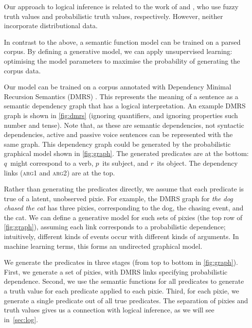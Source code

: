 \documentclass[11pt]{article}
\begin{document}
Our approach to logical inference is related to the work of
 and ,
who use fuzzy truth values and probabilistic truth values, respectively.
However, neither incorporate distributional data.

In contrast to the above,
a semantic function model can be trained on a parsed corpus.
By defining a generative model,
we can apply unsupervised learning:
optimising the model parameters
to maximise the probability of generating the corpus data.

Our model can be trained on a corpus annotated with
Dependency Minimal Recursion Semantics (DMRS)
\cite{copestake2005mrs,copestake2009dmrs}.
This represents the meaning of a sentence as a semantic dependency graph
that has a logical interpretation.
An example DMRS graph is shown in \cref{fig:dmrs}
(ignoring quantifiers, and ignoring properties such number and tense).
Note that, as these are semantic dependencies,
not syntactic dependencies,
active and passive voice sentences can be represented with the same graph.
This dependency graph could be generated by the probabilistic graphical model shown in \cref{fig:graph}.
The generated predicates are at the bottom:
$q$~might correspond to a verb, $p$~its subject, and $r$~its object.
The dependency links (\textsc{arg1} and \textsc{arg2}) are at the top.

Rather than generating the predicates directly,
we assume that each predicate is true of a latent, unobserved pixie.
For example, the DMRS graph for \textit{the dog chased the cat} has three pixies,
corresponding to the dog, the chasing event, and the cat.
We can define a generative model for such sets of pixies
(the top row of \cref{fig:graph}),
assuming each link corresponds to a probabilistic dependence;
intuitively, different kinds of events occur with different kinds of arguments.
In machine learning terms, this forms an undirected graphical model.

We generate the predicates in three stages (from top to bottom in \cref{fig:graph}).
First, we generate a set of pixies,
with DMRS links specifying probabilistic dependence.
Second, we use the semantic functions for all predicates
to generate a truth value for each predicate applied to each pixie.
Third, for each pixie, we generate a single predicate out of all true predicates.
The separation of pixies and truth values
gives us a connection with logical inference,
as we will see in~\cref{sec:log}.
\end{document}
